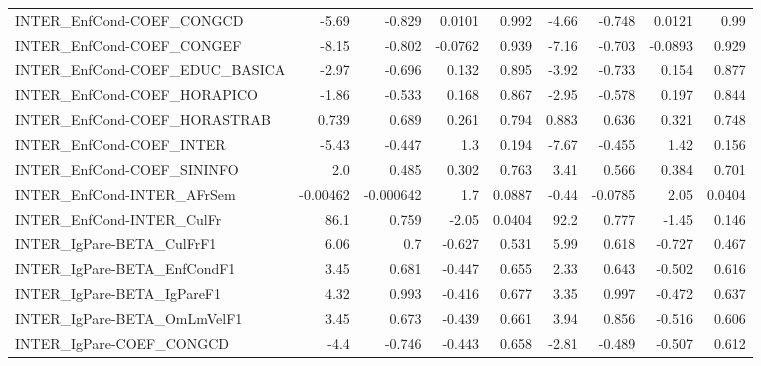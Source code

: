 \begin{tabular}{lrrrrrrrr}
INTER\_EnfCond-COEF\_CONGCD             &       -5.69 &       -0.829 &  0.0101 &    0.992 &      -4.66 &      -0.748 &       0.0121 &          0.99 \\
INTER\_EnfCond-COEF\_CONGEF             &       -8.15 &       -0.802 & -0.0762 &    0.939 &      -7.16 &      -0.703 &      -0.0893 &         0.929 \\
INTER\_EnfCond-COEF\_EDUC\_BASICA        &       -2.97 &       -0.696 &   0.132 &    0.895 &      -3.92 &      -0.733 &        0.154 &         0.877 \\
INTER\_EnfCond-COEF\_HORAPICO           &       -1.86 &       -0.533 &   0.168 &    0.867 &      -2.95 &      -0.578 &        0.197 &         0.844 \\
INTER\_EnfCond-COEF\_HORASTRAB          &       0.739 &        0.689 &   0.261 &    0.794 &      0.883 &       0.636 &        0.321 &         0.748 \\
INTER\_EnfCond-COEF\_INTER              &       -5.43 &       -0.447 &     1.3 &    0.194 &      -7.67 &      -0.455 &         1.42 &         0.156 \\
INTER\_EnfCond-COEF\_SININFO            &         2.0 &        0.485 &   0.302 &    0.763 &       3.41 &       0.566 &        0.384 &         0.701 \\
INTER\_EnfCond-INTER\_AFrSem            &    -0.00462 &    -0.000642 &     1.7 &   0.0887 &      -0.44 &     -0.0785 &         2.05 &        0.0404 \\
INTER\_EnfCond-INTER\_CulFr             &        86.1 &        0.759 &   -2.05 &   0.0404 &       92.2 &       0.777 &        -1.45 &         0.146 \\
INTER\_IgPare-BETA\_CulFrF1             &        6.06 &          0.7 &  -0.627 &    0.531 &       5.99 &       0.618 &       -0.727 &         0.467 \\
INTER\_IgPare-BETA\_EnfCondF1           &        3.45 &        0.681 &  -0.447 &    0.655 &       2.33 &       0.643 &       -0.502 &         0.616 \\
INTER\_IgPare-BETA\_IgPareF1            &        4.32 &        0.993 &  -0.416 &    0.677 &       3.35 &       0.997 &       -0.472 &         0.637 \\
INTER\_IgPare-BETA\_OmLmVelF1           &        3.45 &        0.673 &  -0.439 &    0.661 &       3.94 &       0.856 &       -0.516 &         0.606 \\
INTER\_IgPare-COEF\_CONGCD              &        -4.4 &       -0.746 &  -0.443 &    0.658 &      -2.81 &      -0.489 &       -0.507 &         0.612 \\

\end{tabular}
